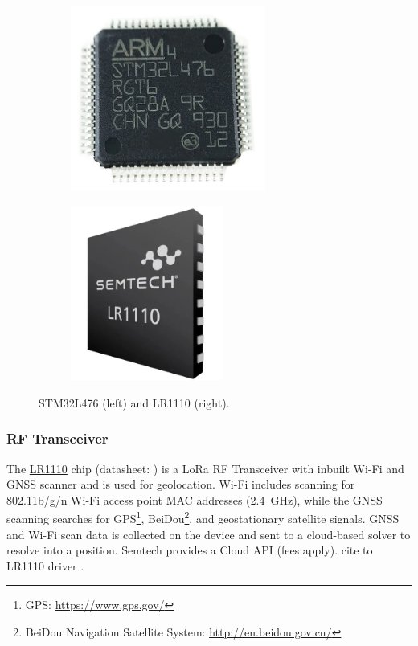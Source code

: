 \begin{figure}[H]
    \centering
    \begin{subfigure}{.45\textwidth}
      \centering
      \includegraphics[width=0.7\textwidth]{figures/STM32L476.jpg}
    \end{subfigure}
    \begin{subfigure}{.45\textwidth}
      \centering
      \includegraphics[width=0.55\textwidth]{figures/LR1110.png}
    \end{subfigure}
    \caption{STM32L476 (left) and LR1110 (right).}
    \label{fig:chips}
\end{figure}

\subsubsection{RF Transceiver}
The \hyperref[bom:lr1110]{LR1110} chip (datasheet: ) is a \ac{LoRa} RF Transceiver with inbuilt Wi-Fi and \ac{GNSS} scanner and is used for geolocation. Wi-Fi includes scanning for 802.11b/g/n Wi-Fi access point \ac{MAC} addresses (\SI{2.4}{\giga\hertz}), while the \ac{GNSS} scanning searches for \ac{GPS}\footnote{GPS: \url{https://www.gps.gov/}}, BeiDou\footnote{BeiDou Navigation Satellite System: \url{http://en.beidou.gov.cn/}}, and geostationary satellite signals. \ac{GNSS} and Wi-Fi scan data is collected on the device and sent to a cloud-based solver to resolve into a position. Semtech provides a Cloud API (fees apply).
cite to LR1110 driver \cite{lr11xx_driver}.

